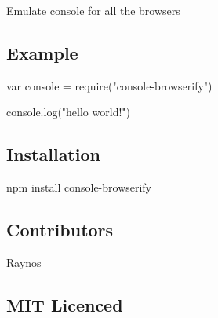 \href{http://travis-ci.org/Raynos/console-browserify}{\tt }

\href{http://ci.testling.com/Raynos/console-browserify}{\tt }

Emulate console for all the browsers

\subsection*{Example}


\begin{DoxyCode}
var console = require("console-browserify")

console.log("hello world!")
\end{DoxyCode}


\subsection*{Installation}

{\ttfamily npm install console-\/browserify}

\subsection*{Contributors}


\begin{DoxyItemize}
\item Raynos
\end{DoxyItemize}

\subsection*{M\+IT Licenced}
